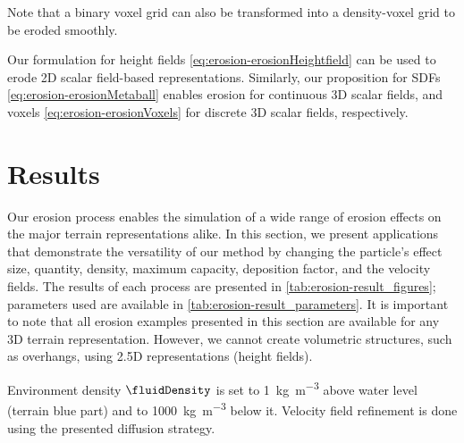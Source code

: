Note that a binary voxel grid can also be transformed into a density-voxel grid to be eroded smoothly.

Our formulation for height fields \eqref{eq:erosion-erosionHeightfield} can be used to erode 2D scalar field-based representations. Similarly,  
our proposition for SDFs \eqref{eq:erosion-erosionMetaball} enables erosion for continuous 3D scalar fields, and voxels \eqref{eq:erosion-erosionVoxels} for discrete 3D scalar fields, respectively.


\section{Results}
\label{sec:erosion-erosion-examples}

Our erosion process enables the simulation of a wide range of erosion effects on the major terrain representations alike. In this section, we present applications that demonstrate the versatility of our method by changing the particle's effect size, quantity, density, maximum capacity, deposition factor, and the velocity fields. The results of each process are presented in \cref{tab:erosion-result_figures}; parameters used are available in \cref{tab:erosion-result_parameters}.  
It is important to note that all erosion examples presented in this section are available for any 3D terrain representation. However, we cannot create volumetric structures, such as overhangs, using 2.5D representations (height fields).

Environment density $\fluidDensity$ is set to \SI{1}{\kilogram\per\cubic\meter} above water level (terrain blue part) and to \SI{1000}{\kilogram\per\cubic\meter} below it.  
Velocity field refinement is done using the presented diffusion strategy.


